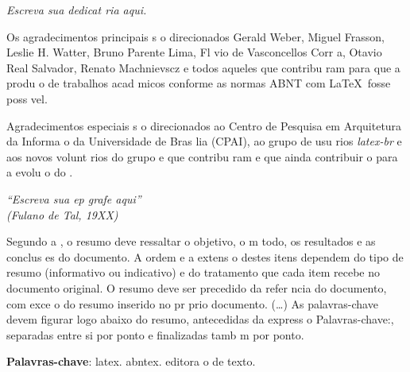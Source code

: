 \documentclass{article}
\begin{document}
\begin{dedicatoria}
   \vspace*{\fill}
   \centering
   \noindent
   \textit{ Escreva sua dedicat ria aqui.} \vspace*{\fill}
\end{dedicatoria}

\begin{agradecimentos}
Os agradecimentos principais s o direcionados   Gerald Weber, Miguel Frasson,
Leslie H. Watter, Bruno Parente Lima, Fl vio de Vasconcellos Corr a, Otavio Real
Salvador, Renato Machnievscz e todos aqueles que
contribu ram para que a produ o de trabalhos acad micos conforme
as normas ABNT com \LaTeX\ fosse poss vel.

Agradecimentos especiais s o direcionados ao Centro de Pesquisa em Arquitetura
da Informa o da Universidade de
Bras lia (CPAI), ao grupo de usu rios
\emph{latex-br} e aos
novos volunt rios do grupo
\emph{\abnTeX} e que contribu ram e que ainda
contribuir o para a evolu o do \abnTeX.

\end{agradecimentos}

\begin{epigrafe}
    \vspace*{\fill}
	\begin{flushright}
		\textit{``Escreva sua ep grafe aqui''\\
		(Fulano de Tal, 19XX)}
	\end{flushright}
\end{epigrafe}


\setlength{\absparsep}{18pt} %
\begin{resumo}
 Segundo a \cite{NBR6028:2003}, o resumo deve ressaltar o
 objetivo, o m todo, os resultados e as conclus es do documento. A ordem e a extens o
 destes itens dependem do tipo de resumo (informativo ou indicativo) e do
 tratamento que cada item recebe no documento original. O resumo deve ser
 precedido da refer ncia do documento, com exce o do resumo inserido no
 pr prio documento. (\ldots) As palavras-chave devem figurar logo abaixo do
 resumo, antecedidas da express o Palavras-chave:, separadas entre si por
 ponto e finalizadas tamb m por ponto.

 \textbf{Palavras-chave}: latex. abntex. editora o de texto.
\end{resumo}
\end{document}
